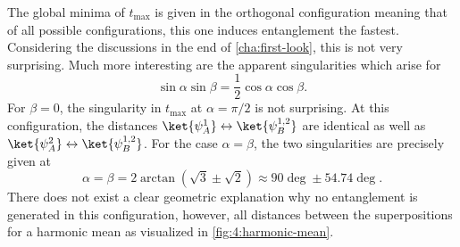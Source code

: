 The global minima of $t_\mathrm{max}$ is given in the orthogonal configuration meaning that of all possible configurations, this one induces entanglement the fastest. Considering the discussions in the end of \cref{cha:first-look}, this is not very surprising.
Much more interesting are the apparent singularities which arise for 
\begin{equation}
  \sin\alpha\sin\beta = \frac{1}{2}\cos\alpha\cos\beta .
\end{equation}
For $\beta=0$, the singularity in $t_\mathrm{max}$ at $\alpha=\pi/2$ is not surprising. At this configuration, the distances $\ket{\psi_A^1} \leftrightarrow \ket{\psi_B^{1,2}}$ are identical as well as $\ket{\psi_A^2} \leftrightarrow \ket{\psi_B^{1,2}}$. 
For the case $\alpha = \beta$, the two singularities are precisely given at
\begin{equation}
  \alpha = \beta = 2\arctan(\sqrt{3}\pm\sqrt{2}) \approx 90\deg \pm 54.74\deg.
\end{equation}
There does not exist a clear geometric explanation why no entanglement is generated in this configuration, however, all distances between the superpositions for a harmonic mean as visualized in \cref{fig:4:harmonic-mean}.
%   





